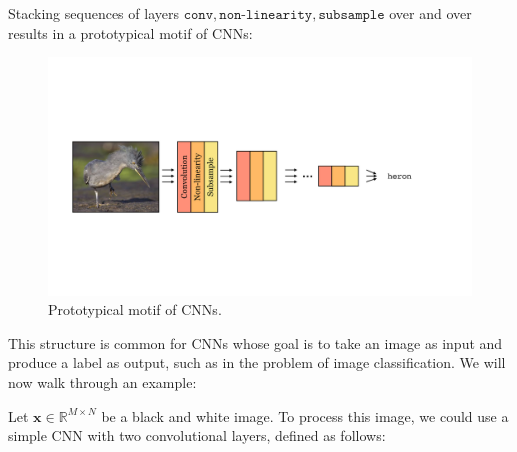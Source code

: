 Stacking sequences of layers $\texttt{conv}, \texttt{non-linearity}, \texttt{subsample}$ over and over results in a prototypical motif of CNNs:
\begin{figure}[h]
\centerline{
    \includegraphics[width=1.0\linewidth]{./figures/convolutional_neural_nets/convnet_motif.pdf}}
    \caption{Prototypical motif of CNNs.}
    \label{fig:convolutional_neural_nets:convnet_motif}
\end{figure}

This structure is common for CNNs whose goal is to take an image as input and produce a label as output, such as in the problem of image classification. We will now walk through an example:

Let $\mathbf{x} \in \mathbb{R}^{M \times N}$ be a black and white image. To process this image, we could use a simple CNN with two convolutional layers, defined as follows:


